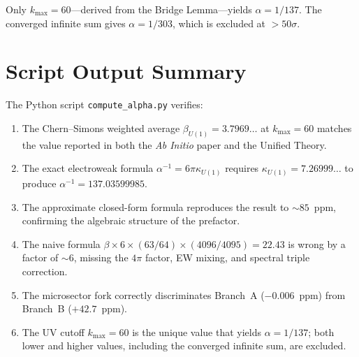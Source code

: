 \documentclass[12pt,a4paper]{article}
\begin{document}
Only $k_{\max} = 60$---derived from the Bridge Lemma---yields
$\alpha = 1/137$.  The converged infinite sum gives $\alpha = 1/303$,
which is excluded at $> 50\sigma$.

\section{Script Output Summary}

The Python script \texttt{compute\_alpha.py} verifies:

\begin{enumerate}
\item The Chern--Simons weighted average $\beta_{U(1)} = 3.7969\ldots$
  at $k_{\max} = 60$ matches the value reported in both the
  \textit{Ab Initio} paper and the Unified Theory.

\item The exact electroweak formula $\alpha^{-1} = 6\pi\kappa_{U(1)}$
  requires $\kappa_{U(1)} = 7.26999\ldots$ to produce
  $\alpha^{-1} = 137.03599985$.

\item The approximate closed-form formula reproduces the result to
  $\sim 85$~ppm, confirming the algebraic structure of the prefactor.

\item The naive formula $\beta \times 6 \times (63/64) \times (4096/4095)
  = 22.43$ is wrong by a factor of $\sim 6$, missing the $4\pi$ factor,
  EW mixing, and spectral triple correction.

\item The microsector fork correctly discriminates Branch~A
  ($-0.006$~ppm) from Branch~B ($+42.7$~ppm).

\item The UV cutoff $k_{\max} = 60$ is the unique value that yields
  $\alpha = 1/137$; both lower and higher values, including the
  converged infinite sum, are excluded.
\end{enumerate}
\end{document}
